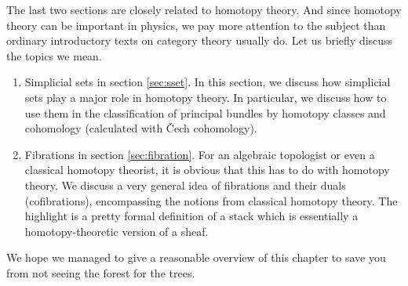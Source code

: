 The last two sections are closely related to homotopy theory.
And since homotopy theory can be important in physics, we pay more attention to the subject than ordinary introductory texts on category theory usually do.
Let us briefly discuss the topics we mean.
\begin{enumerate}
\item[$\bullet$]
Simplicial sets in section \ref{sec:sset}.
In this section, we discuss how simplicial sets play a major role in homotopy theory.
In particular, we discuss how to use them in the classification of principal bundles by homotopy classes and cohomology ({\glqq}calculated{\grqq} with \v{C}ech cohomology).
\item[$\bullet$]
Fibrations in section \ref{sec:fibration}.
For an algebraic topologist or even a classical homotopy theorist, it is obvious that this has to do with homotopy theory.
We discuss a very general idea of fibrations and their duals (cofibrations), encompassing the notions from classical homotopy theory.
The highlight is a pretty formal definition of a {\glqq}stack{\grqq} which is essentially a homotopy-theoretic version of a sheaf.
\end{enumerate}
We hope we managed to give a reasonable overview of this chapter to save you from not seeing the forest for the trees.
